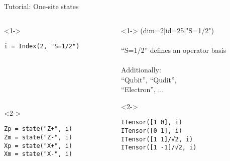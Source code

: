 \begin{frame}[fragile]{Tutorial: One-site states}

\begin{columns}

\begin{column}{4.5cm}

\begin{onlyenv}<1->
  \begin{lstlisting}[language=JuliaLocal, style=julia, basicstyle=\small]
  i = Index(2, "S=1/2")







  \end{lstlisting}
\end{onlyenv}

\begin{onlyenv}<2->
\begin{lstlisting}[language=JuliaLocal, style=julia, basicstyle=\small]
Zp = state("Z+", i)
Zm = state("Z-", i)
Xp = state("X+", i)
Xm = state("X-", i)
\end{lstlisting}
\end{onlyenv}

\end{column}

\begin{column}{5cm}

\begin{onlyenv}<1->
(dim=2|id=25|"S=1/2") \\
~\\
``S=1/2'' defines an operator basis \\
~\\
Additionally:\\
``Qubit'', ``Qudit'',\\
``Electron'', $\dots$
\end{onlyenv}

\begin{onlyenv}<2->
\vspace*{0.2cm}
~\\
\begin{lstlisting}[language=JuliaLocal, mathescape, style=julia, basicstyle=\small]
ITensor([1 0], i)
ITensor([0 1], i)
ITensor([1 1]/√2, i)
ITensor([1 -1]/√2, i)
\end{lstlisting}
\end{onlyenv}

\end{column}

\end{columns}

\end{frame}
